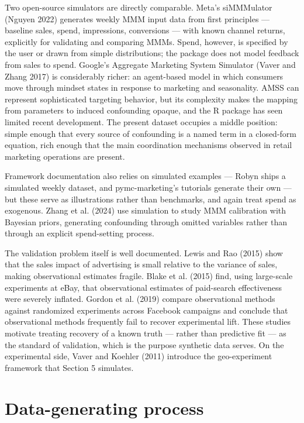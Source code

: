 \documentclass[
  conference]{IEEEtran}
\begin{document}
Two open-source simulators are directly comparable. Meta's siMMMulator
(Nguyen 2022) generates weekly MMM input data from first principles ---
baseline sales, spend, impressions, conversions --- with known channel
returns, explicitly for validating and comparing MMMs. Spend, however,
is specified by the user or drawn from simple distributions; the package
does not model feedback from sales to spend. Google's Aggregate
Marketing System Simulator (Vaver and Zhang 2017) is considerably
richer: an agent-based model in which consumers move through mindset
states in response to marketing and seasonality. AMSS can represent
sophisticated targeting behavior, but its complexity makes the mapping
from parameters to induced confounding opaque, and the R package has
seen limited recent development. The present dataset occupies a middle
position: simple enough that every source of confounding is a named term
in a closed-form equation, rich enough that the main coordination
mechanisms observed in retail marketing operations are present.

Framework documentation also relies on simulated examples --- Robyn
ships a simulated weekly dataset, and pymc-marketing's tutorials
generate their own --- but these serve as illustrations rather than
benchmarks, and again treat spend as exogenous. Zhang et al. (2024) use
simulation to study MMM calibration with Bayesian priors, generating
confounding through omitted variables rather than through an explicit
spend-setting process.

The validation problem itself is well documented. Lewis and Rao (2015)
show that the sales impact of advertising is small relative to the
variance of sales, making observational estimates fragile. Blake et al.
(2015) find, using large-scale experiments at eBay, that observational
estimates of paid-search effectiveness were severely inflated. Gordon et
al. (2019) compare observational methods against randomized experiments
across Facebook campaigns and conclude that observational methods
frequently fail to recover experimental lift. These studies motivate
treating recovery of a known truth --- rather than predictive fit --- as
the standard of validation, which is the purpose synthetic data serves.
On the experimental side, Vaver and Koehler (2011) introduce the
geo-experiment framework that Section 5 simulates.

\section{Data-generating process}\label{data-generating-process}
\end{document}
